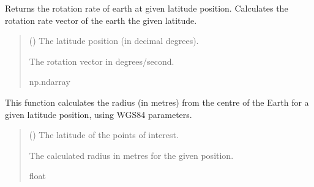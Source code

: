\documentclass[letterpaper,10pt,english]{sphinxmanual}
\begin{document}

\begin{fulllineitems}
\label{\detokenize{modules/util/transformations:qnav.util.transformations.rotation_rate_vec}}
\pysigstartsignatures
{}
\pysigstopsignatures
\sphinxAtStartPar
Returns the rotation rate of earth at given latitude position.
Calculates the rotation rate vector of the earth the given latitude.
\begin{quote}\begin{description}
\sphinxAtStartPar
{} () \textendash{} The latitude position (in decimal degrees).

\sphinxAtStartPar
The rotation vector in degrees/second.

\sphinxAtStartPar
np.ndarray

\end{description}\end{quote}

\end{fulllineitems}


\begin{fulllineitems}
\label{\detokenize{modules/util/transformations:qnav.util.transformations.radius84}}
\pysigstartsignatures
{}
\pysigstopsignatures
\sphinxAtStartPar
This function calculates the radius (in metres) from the centre of the
Earth for a given latitude position, using WGS84 parameters.
\begin{quote}\begin{description}
\sphinxAtStartPar
{} () \textendash{} The latitude of the points of interest.

\sphinxAtStartPar
The calculated radius in metres for the given position.

\sphinxAtStartPar
float

\end{description}\end{quote}

\end{fulllineitems}
\end{document}
